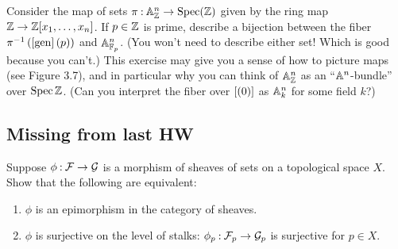 \documentclass[12pt]{memoir}
\begin{document}
\begin{ptcbr}
\end{ptcbr}

\begin{Ej}[3.2.Q Vakil]
    Consider the map of sets $\pi\mathbin{:}\mathbb{A}^n_{\mathbb{Z}}\to\operatorname{Spec}(\mathbb{Z})$
given by the ring map $\mathbb{Z}\to\mathbb{Z}[x_1,\dots,x_n]$. If $p\in\mathbb{Z}$ is prime, describe a bijection between the fiber $\pi^{-1}\left(\left\lbrack\operatorname{gen}\right\rbrack(p)\right)$ and $\mathbb{A}_{\mathbb{F}_p}^n$. (You won't need to describe either set! Which is good because you can't.) This exercise may give you a sense of how to picture maps (see Figure 3.7), and in particular why you can think of $\mathbb{A}^n_{\mathbb{Z}}$ as an “$\mathbb{A}^n$-bundle” over $\operatorname{Spec}\mathbb{Z}$. (Can you interpret the fiber over $\left\lbrack(0)\right\rbrack$ as $\mathbb{A}^n_k$ for some field $k$?)
\end{Ej}

\begin{ptcbr}
   
\end{ptcbr}
\subsection{Missing from last HW}

\begin{Ej}
    Suppose $\phi\mathbin{:}\mathcal{F}\to\mathcal{G}$ is a morphism of sheaves of sets on a topological space $X$. Show that the following are equivalent:
\begin{enumerate}
    \item $\phi$ is an epimorphism in the category of sheaves. 
    \item $\phi$ is surjective on the level of stalks: $\phi_p\mathbin{:}\mathcal{F}_p\to\mathcal{G}_p$ is surjective for $p\in X$.
\end{enumerate}
\end{Ej}
\end{document}
